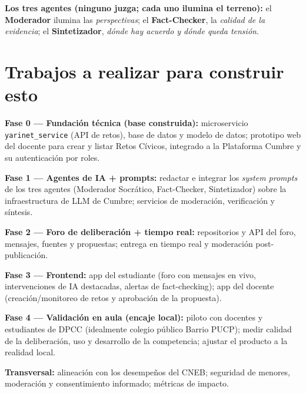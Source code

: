\documentclass[11pt,a4paper]{article}
\begin{document}
\noindent\textbf{Los tres agentes (ninguno juzga; cada uno ilumina el terreno):} el \textbf{Moderador} ilumina las \textit{perspectivas}; el \textbf{Fact-Checker}, la \textit{calidad de la evidencia}; el \textbf{Sintetizador}, \textit{d\'onde hay acuerdo y d\'onde queda tensi\'on}.

\section{Trabajos a realizar para construir esto}

\noindent\textbf{Fase 0 --- Fundaci\'on t\'ecnica (base construida):} microservicio \texttt{yarinet\_service} (API de retos), base de datos y modelo de datos; prototipo web del docente para crear y listar Retos C\'ivicos, integrado a la Plataforma Cumbre y su autenticaci\'on por roles.

\medskip
\noindent\textbf{Fase 1 --- Agentes de IA + prompts:} redactar e integrar los \textit{system prompts} de los tres agentes (Moderador Socr\'atico, Fact-Checker, Sintetizador) sobre la infraestructura de LLM de Cumbre; servicios de moderaci\'on, verificaci\'on y s\'intesis.

\medskip
\noindent\textbf{Fase 2 --- Foro de deliberaci\'on + tiempo real:} repositorios y API del foro, mensajes, fuentes y propuestas; entrega en tiempo real y moderaci\'on post-publicaci\'on.

\medskip
\noindent\textbf{Fase 3 --- Frontend:} app del estudiante (foro con mensajes en vivo, intervenciones de IA destacadas, alertas de fact-checking); app del docente (creaci\'on/monitoreo de retos y aprobaci\'on de la propuesta).

\medskip
\noindent\textbf{Fase 4 --- Validaci\'on en aula (encaje local):} piloto con docentes y estudiantes de DPCC (idealmente colegio p\'ublico Barrio PUCP); medir calidad de la deliberaci\'on, uso y desarrollo de la competencia; ajustar el producto a la realidad local.

\medskip
\noindent\textbf{Transversal:} alineaci\'on con los desempe\~nos del CNEB; seguridad de menores, moderaci\'on y consentimiento informado; m\'etricas de impacto.
\end{document}

